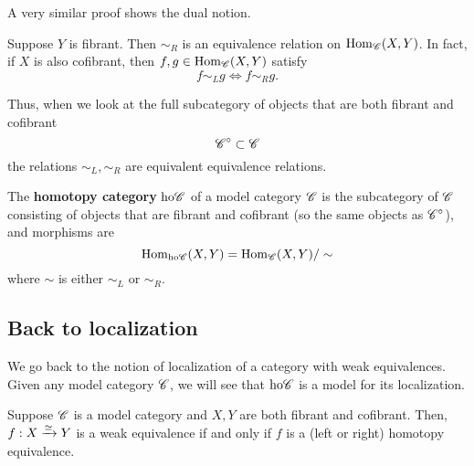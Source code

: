 \documentclass[11pt]{amsart}
\def\ho{{\rm ho}}
\begin{document}
A very similar proof shows the dual notion.

\begin{prop}
Suppose $Y$ is fibrant. 
Then $\sim_R$ is an equivalence relation on ${\rm Hom}_{\mathscr C}(X,Y)$. 
In fact, if $X$ is also cofibrant, then $f,g \in {\rm Hom}_\mathscr C(X,Y)$ satisfy
\[
f \sim_L g \iff f \sim_R g .
\]
\end{prop}

Thus, when we look at the full subcategory of objects that are both fibrant and cofibrant 
\[
\mathscr C^{\circ} \subset \mathscr C 
\]
the relations $\sim_L,\sim_R$ are equivalent equivalence relations.

\begin{dfn}
The {\bf homotopy category} $\ho \sC$ of a model category $\mathscr C$ is the subcategory of $\mathscr C$ consisting of objects that are fibrant and cofibrant (so the same objects as $\mathscr C^{\circ}$), and morphisms are
\[
\Hom_{\ho \sC} (X,Y) = \Hom_{\sC}(X,Y) / \sim
\]
where $\sim$ is either $\sim_L$ or $\sim_R$. 
\end{dfn}

\subsection{Back to localization}

%

We go back to the notion of localization of a category with weak equivalences. 
Given any model category $\mathscr C$, we will see that $\ho \sC$ is a model for its localization. 

\begin{prop}
[Whitehead]
Suppose $\mathscr C$ is a model category and $X,Y$ are both fibrant and cofibrant.
Then, $f : X \xrightarrow{\simeq} Y$ is a weak equivalence if and only if $f$ is a (left or right) homotopy equivalence. 
\end{prop}
\end{document}
